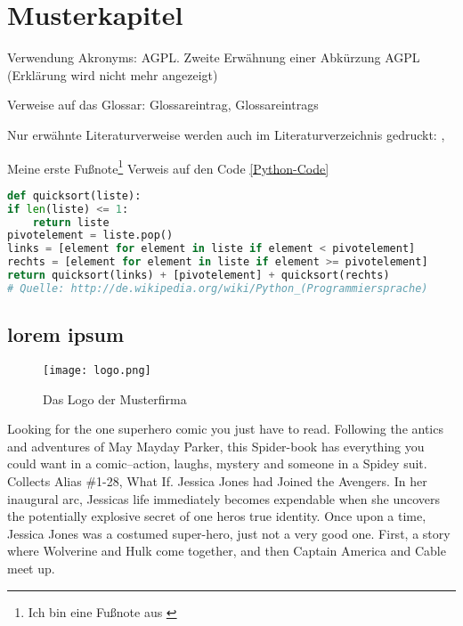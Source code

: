 
\chapter{Musterkapitel}

Verwendung Akronyms: \acf{AGPL}. Zweite Erwähnung einer Abkürzung \ac{AGPL} (Erklärung wird nicht mehr angezeigt)

Verweise auf das Glossar: \gls{Glossareintrag}, \glspl{Glossareintrag}

Nur erwähnte Literaturverweise werden auch im Literaturverzeichnis gedruckt:
\cite{baumgartner:2002}, \cite{dreyfus:1980}

Meine erste Fußnote\footnote{Ich bin eine Fußnote aus \cite{mustermann:2012}} Verweis auf den Code \autoref{Python-Code}

\begin{lstlisting}[caption=Python-Code, label=Python-Code, language=Python]
def quicksort(liste):
if len(liste) <= 1:
	return liste
pivotelement = liste.pop()
links = [element for element in liste if element < pivotelement]
rechts = [element for element in liste if element >= pivotelement]
return quicksort(links) + [pivotelement] + quicksort(rechts)
# Quelle: http://de.wikipedia.org/wiki/Python_(Programmiersprache)
\end{lstlisting}

\section{lorem ipsum}

\begin{wrapfigure}{r}{.4\textwidth}
\centering
\texttt{[image: logo.png]}
\vspace{-15pt}
\caption{Das Logo der Musterfirma\footnotemark}
\end{wrapfigure}

Looking for the one superhero comic you just have to read. Following the antics and adventures of May Mayday Parker, 
this Spider-book has everything you could want in a comic--action, laughs, mystery and someone in a Spidey suit. 
Collects Alias \#1-28, What If. Jessica Jones had Joined the Avengers. In her inaugural arc, Jessicas life immediately 
becomes expendable when she uncovers the potentially explosive secret of one heros true identity. 
Once upon a time, Jessica Jones was a costumed super-hero, just not a very good one. First, a story where Wolverine and 
Hulk come together, and then Captain America and Cable meet up.

